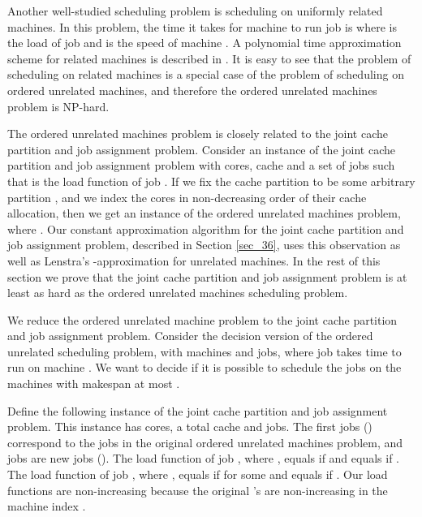 \documentclass[11pt]{article}
\begin{document}
Another well-studied scheduling problem is scheduling on uniformly related machines. In this problem, the time it takes for machine  to run job  is  where  is the  load of job  and  is the  speed of machine . A polynomial time approximation scheme for related machines is described in \cite{HS88}. It is easy to see that the problem of scheduling on related machines  is a special case of the problem of scheduling on ordered unrelated machines, and therefore the ordered unrelated machines problem is NP-hard.

The ordered unrelated machines problem is closely related to the joint cache partition and job assignment problem.
Consider an instance of the joint cache partition and job assignment problem with  cores,  cache and a set of jobs  such that  is the load function of job .
If we fix the cache partition to be some arbitrary partition , and we index the cores in non-decreasing order of their cache allocation,
then we get an instance of the ordered unrelated machines problem, where .
Our constant approximation algorithm for the joint cache partition and job assignment problem, described in Section \ref{sec_36}, uses this observation as well as Lenstra's -approximation for unrelated  machines.
In the rest of this section we prove that the joint cache partition and job assignment problem is at least as hard as the
ordered unrelated machines scheduling problem.

We reduce  the ordered unrelated machine problem to the joint cache partition and job assignment problem.
Consider the decision version of the ordered unrelated scheduling problem, with  machines and  jobs, where job  takes time  to run on machine .
We want to decide if it is possible to schedule the jobs on the machines with makespan at most .

Define the following instance of the joint cache partition and job assignment problem.
This instance has   cores, a total cache  and  jobs.
The first  jobs () correspond to the jobs in the original ordered unrelated machines problem, and  jobs are new jobs ().
The load function  of job , where ,  equals  if  and equals  if .
The load function  of job , where ,  equals  if  for some  and equals  if .
Our load functions  are non-increasing because the original 's are non-increasing in the machine index .
\end{document}

